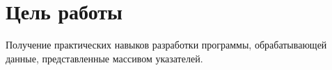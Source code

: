 \section*{Цель работы}

Получение практических навыков разработки программы,
обрабатывающей данные, представленные массивом указателей.